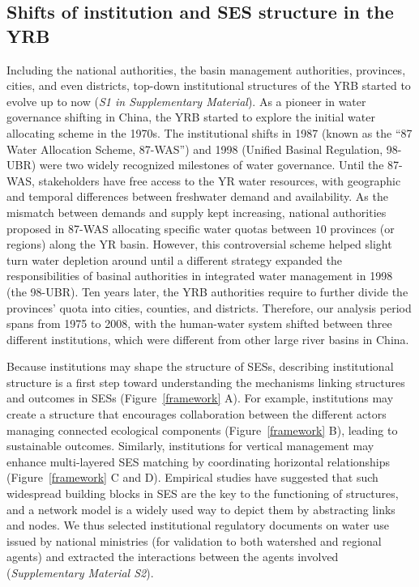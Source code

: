 \subsection{Shifts of institution and SES structure in the YRB}
\label{result-0}

Including the national authorities, the basin management authorities, provinces, cities, and even districts, top-down institutional structures of the YRB started to evolve up to now (\textit{S1 in Supplementary Material}).
As a pioneer in water governance shifting in China, the YRB started to explore the initial water allocating scheme in the 1970s.
The institutional shifts in 1987 (known as the ``87 Water Allocation Scheme, 87-WAS'') and 1998 (Unified Basinal Regulation, 98-UBR) were two widely recognized milestones of water governance.
Until the 87-WAS, stakeholders have free access to the YR water resources, with geographic and temporal differences between freshwater demand and availability.
As the mismatch between demands and supply kept increasing, national authorities proposed in 87-WAS allocating specific water quotas between $10$ provinces (or regions) along the YR basin.
However, this controversial scheme helped slight turn water depletion around until a different strategy expanded the responsibilities of basinal authorities in integrated water management in 1998 (the 98-UBR).
Ten years later, the YRB authorities require to further divide the provinces' quota into cities, counties, and districts.
Therefore, our analysis period spans from 1975 to 2008, with the human-water system shifted between three different institutions, which were different from other large river basins in China.

Because institutions may shape the structure of SESs, describing institutional structure is a first step toward understanding the mechanisms linking structures and outcomes in SESs (Figure~\ref{framework} A).
For example, institutions may create a structure that encourages collaboration between the different actors managing connected ecological components (Figure~\ref{framework} B), leading to sustainable outcomes.
Similarly, institutions for vertical management may enhance multi-layered SES matching by coordinating horizontal relationships (Figure~\ref{framework} C and D).
Empirical studies have suggested that such widespread building blocks in SES are the key to the functioning of structures, and a network model is a widely used way to depict them by abstracting links and nodes.
We thus selected institutional regulatory documents on water use issued by national ministries (for validation to both watershed and regional agents) and extracted the interactions between the agents involved (\textit{Supplementary Material S2}).

